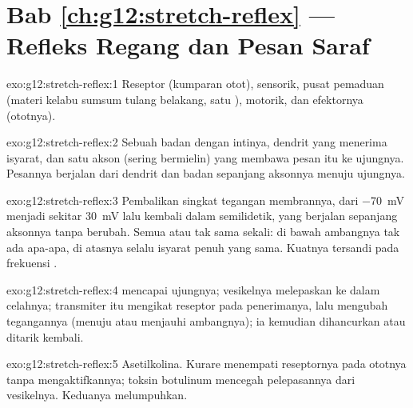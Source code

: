 \section*{Bab \ref{ch:g12:stretch-reflex} --- Refleks Regang dan Pesan Saraf}

\begin{solution}{exo:g12:stretch-reflex:1}
Reseptor (kumparan otot),  sensorik, pusat pemaduan (materi
kelabu sumsum tulang belakang, satu ),  motorik, dan
efektornya (ototnya).
\end{solution}

\begin{solution}{exo:g12:stretch-reflex:2}
Sebuah badan  dengan intinya, dendrit yang menerima isyarat, dan
satu akson (sering bermielin) yang membawa pesan  itu ke
ujungnya. Pesannya berjalan dari dendrit dan badan  sepanjang
aksonnya menuju ujungnya.
\end{solution}

\begin{solution}{exo:g12:stretch-reflex:3}
Pembalikan singkat tegangan membrannya, dari \qty{-70}{mV} menjadi
sekitar \qty{+30}{mV} lalu kembali dalam semilidetik, yang berjalan
sepanjang aksonnya tanpa berubah. Semua atau tak sama sekali: di bawah
ambangnya tak ada apa-apa, di atasnya selalu isyarat penuh yang sama.
Kuatnya tersandi pada frekuensi .
\end{solution}

\begin{solution}{exo:g12:stretch-reflex:4}
 mencapai ujungnya; vesikelnya melepaskan
 ke dalam celahnya; transmiter itu mengikat reseptor
pada  penerimanya, lalu mengubah tegangannya (menuju atau menjauhi
ambangnya); ia kemudian dihancurkan atau ditarik kembali.
\end{solution}

\begin{solution}{exo:g12:stretch-reflex:5}
Asetilkolina. Kurare menempati reseptornya pada ototnya tanpa
mengaktifkannya; toksin botulinum mencegah pelepasannya dari
vesikelnya. Keduanya melumpuhkan.
\end{solution}

